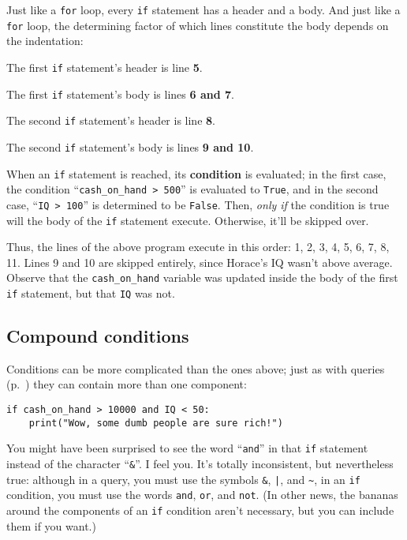 Just like a \texttt{for} loop, every \texttt{if} statement has a header and a
body. And just like a \texttt{for} loop, the determining factor of which lines
constitute the body depends on the indentation:

\begin{compactitem}
\item[\leftpointright] The first \texttt{if} statement's header is line \textbf{5}.
\item[\leftpointright] The first \texttt{if} statement's body is lines \textbf{6 and 7}.
\item[\leftpointright] The second \texttt{if} statement's header is line \textbf{8}.
\item[\leftpointright] The second \texttt{if} statement's body is lines
\textbf{9 and 10}.
\end{compactitem}


When an \texttt{if} statement is reached, its \textbf{condition} is evaluated;
in the first case, the condition ``\texttt{cash\_on\_hand > 500}'' is evaluated
to \texttt{True}, and in the second case, ``\texttt{IQ > 100}'' is determined
to be \texttt{False}. Then, \textit{only if} the condition is true will the
body of the \texttt{if} statement execute. Otherwise, it'll be skipped over.

Thus, the lines of the above program execute in this order: 1, 2, 3, 4, 5, 6,
7, 8, 11. Lines 9 and 10 are skipped entirely, since Horace's IQ wasn't above
average. Observe that the \texttt{cash\_on\_hand} variable was updated inside
the body of the first \texttt{if} statement, but that \texttt{IQ} was not.

\subsection{Compound conditions}


Conditions can be more complicated than the ones above; just as with queries
(p.~\pageref{seriesCompoundQueries}) they can contain more than one component:

\begin{Verbatim}[fontsize=\small,samepage=true,frame=single,framesep=3mm]
if cash_on_hand > 10000 and IQ < 50:
    print("Wow, some dumb people are sure rich!")
\end{Verbatim}


You might have been surprised to see the word ``\texttt{and}'' in that
\texttt{if} statement instead of the character ``\texttt{\&}''. I feel you.
It's totally inconsistent, but nevertheless true: although in a query, you must
use the symbols \texttt{\&}, \texttt{|}, and \texttt{\textasciitilde}, in an
\texttt{if} condition, you must use the words \texttt{and}, \texttt{or}, and
\texttt{not}. (In other news, the bananas around the components of an
\texttt{if} condition aren't necessary, but you can include them if you want.)

